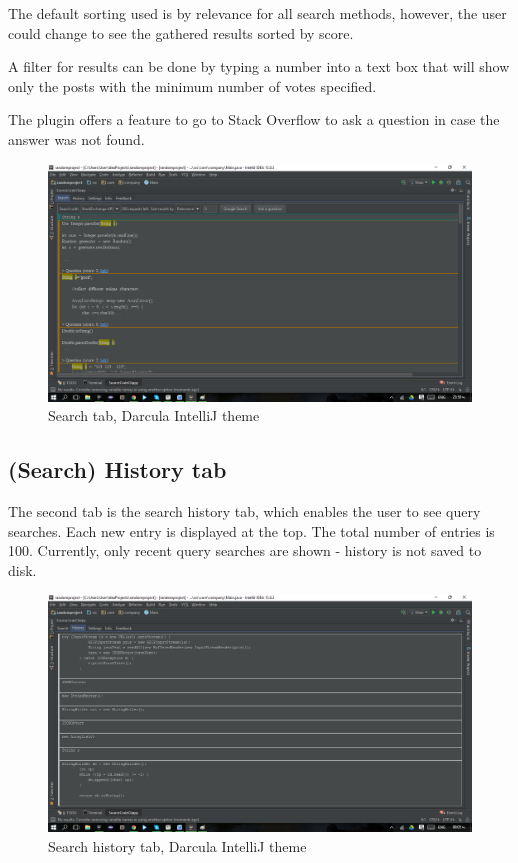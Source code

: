 \documentclass{l4proj}
\begin{document}
The default sorting used is by relevance for all search methods, however, the user could change to see the gathered results sorted by score.

A filter for results can be done by typing a number into a text box that will show only the posts with the minimum number of votes specified.

The plugin offers a feature to go to Stack Overflow to ask a question in case the answer was not found.

\begin{figure}[H]
\includegraphics[scale=0.4]{tab-search}
\centering
\caption{Search tab, Darcula IntelliJ theme}
\label{fig:search-tab}
\end{figure}

\subsection{(Search) History tab}
The second tab is the search history tab, which enables the user to see query searches. Each new entry is displayed at the top. The total number of entries is 100. Currently, only recent query searches are shown - history is not saved to disk.

\begin{figure}[H]
\includegraphics[scale=0.4]{tab-history}
\centering
\caption{Search history tab, Darcula IntelliJ theme}
\label{fig:history-tab}
\end{figure}
\end{document}
